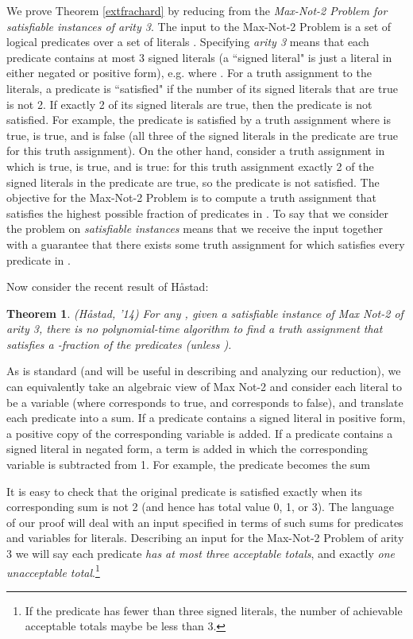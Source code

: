 \documentclass{article}
\newtheorem{theorem}{Theorem}[]
\begin{document}
We prove Theorem \ref{extfrachard} by reducing from the \textit{Max-Not-2 Problem for satisfiable instances of arity 3}. The input to the Max-Not-2 Problem is a set of logical predicates  over a set of literals . Specifying \textit{arity 3} means that each predicate contains at most 3 signed literals (a ``signed literal" is just a literal in either negated or positive form), e.g.  where . For a truth assignment to the literals, a predicate is ``satisfied" if the number of its signed literals that are true is not 2. If exactly 2 of its signed literals are true, then the predicate is not satisfied. For example, the predicate  is satisfied by a truth assignment where  is true,  is true, and  is false (all three of the signed literals in the predicate are true for this truth assignment). On the other hand, consider a truth assignment in which  is true,  is true, and  is true: for this truth assignment exactly 2 of the signed literals in the predicate are true, so the predicate is not satisfied. The objective for the Max-Not-2 Problem is to compute a truth assignment that satisfies the highest possible fraction of predicates in . To say that we consider the problem on \textit{satisfiable instances} means that we receive the input together with a guarantee that there exists some truth assignment for  which satisfies every predicate in .

Now consider the recent result of H{\aa}stad:

\begin{theorem} \label{hastad}(H{\aa}stad, '14)
For any , given a satisfiable instance of Max Not-2 of arity 3, there is no polynomial-time algorithm to find a truth assignment that satisfies a -fraction of the predicates (unless ). 
\end{theorem}

As is standard (and will be useful in describing and analyzing our reduction), we can equivalently take an algebraic view of Max Not-2 and consider each literal  to be a  variable  (where  corresponds to  true, and  corresponds to  false), and translate each predicate into a sum.  If a predicate contains a signed literal in positive form, a positive copy of the corresponding variable is added. If a predicate contains a signed literal in negated form, a term is added in which the corresponding variable is subtracted from 1. For example, the predicate  becomes the sum

It is easy to check that the original predicate is satisfied exactly when its corresponding sum is not 2 (and hence has total value 0, 1, or 3). The language of our proof will deal with an input specified in terms of such sums for predicates and variables for literals. Describing an input for the Max-Not-2 Problem of arity 3 we will say each predicate \textit{has at most three acceptable totals}, and exactly \textit{one unacceptable total}.\footnote{If the predicate has fewer than three signed literals, the number of achievable acceptable totals maybe be less than 3.}
\end{document}
